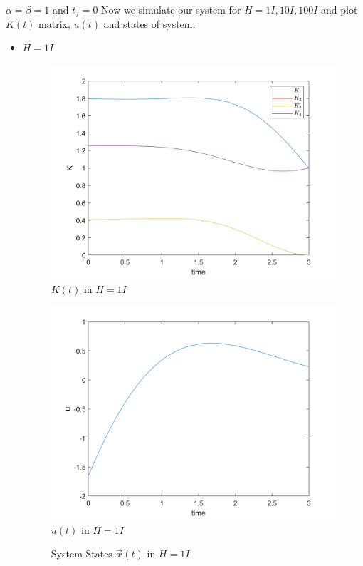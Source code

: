 $\alpha = \beta = 1$ and $t_f= 0$
Now we simulate our system for $H = 1I, 10I, 100I$ and plot $K(t)$ matrix, $u(t)$ and states of system.

\begin{itemize}
	\item $H = 1I$
	\begin{figure}[H]
		\caption{$K(t)$ in $H = 1I$}
		\centering
		\includegraphics[width=12cm]{../Code/Q3/figures/KH1.png}
	\end{figure}
\begin{figure}[H]
	\caption{$u(t)$ in $H = 1I$}
	\centering
	\includegraphics[width=12cm]{../Code/Q3/figures/uH1.png}
\end{figure}
\begin{figure}[H]
	\caption{System States $\vec x(t)$ in $H = 1I$}
	\centering

\end{figure}
\end{itemize}
